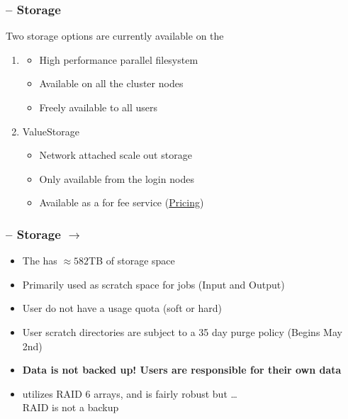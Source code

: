 \begin{frame}
	\frametitle{{\craycs} -- Storage}
	Two storage options are currently available on the {\craycs}
	\begin{enumerate}
		\item {\lustre}
                  \begin{itemize}
                  \item High performance parallel filesystem 
                  \item Available on all the cluster nodes
                    \item Freely available to all users
                  \end{itemize}
		\item ValueStorage
                  \begin{itemize}
                  \item Network attached scale out storage
                  \item Only available from the login nodes
                  \item Available as a for fee service (\href{http://www.hawaii.edu/its/value-storage-pricing/}{Pricing})
                  \end{itemize}
	\end{enumerate}
\end{frame}


\begin{frame}
	\frametitle{{\craycs} -- Storage $\rightarrow$ {\lustre}}
	\begin{itemize}
		\item The {\craycs} has $\approx582$TB of storage space

		\item Primarily used as scratch space for jobs (Input and Output)
		\item User do not have a usage quota (soft or hard)
		\item User scratch directories are subject to a 35 day purge policy (Begins May 2nd)
		\item \textbf{Data is not backed up!  Users are responsible for their own data}
                \item {\lustre} utilizes RAID 6 arrays, and is fairly robust but \ldots~\\RAID is not a backup
	\end{itemize}
\end{frame}



